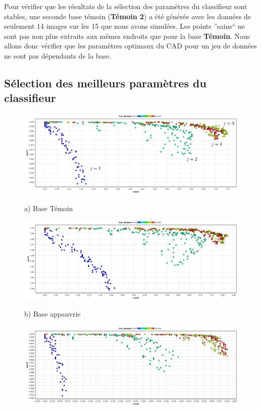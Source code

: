 Pour vérifier que les résultats de la sélection des paramètres du classifieur sont stables, une seconde base témoin (\textbf{Témoin 2}) a été générée avec les données de seulement 14 images sur les 15 que nous avons simulées. Les points ''sains`` ne sont pas non plus extraits aux mêmes endroits que pour la base \textbf{Témoin}. Nous allons donc vérifier que les paramètres optimaux du CAD pour un jeu de données ne sont pas dépendants de la base.


\subsection{Sélection des meilleurs paramètres du classifieur}
\begin{figure}[h!]
\begin{center}
 \includegraphics[width=14cm]{images/pareto_param_200}

{\small a) Base Témoin}
\vspace{0.5cm}

\includegraphics[width=14cm]{images/pareto_param_100.png}

{\small b) Base appauvrie}

 \includegraphics[width=14cm]{images/pareto_param_1000.png}
 

\end{center}
\end{figure}
